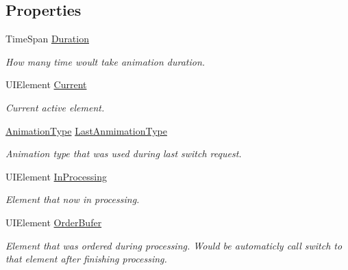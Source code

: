 \subsection*{Properties}
\begin{DoxyCompactItemize}
\item 
Time\+Span \mbox{\hyperlink{class_wpf_handler_1_1_u_i_1_1_controls_1_1_switch_panel_a3640cb1447755f529ffe36bccad2dc34}{Duration}}
\begin{DoxyCompactList}\small\item\em How many time woult take animation duration. \end{DoxyCompactList}\item 
U\+I\+Element \mbox{\hyperlink{class_wpf_handler_1_1_u_i_1_1_controls_1_1_switch_panel_a5412b80c31880fe852a7b82c0a81fd7a}{Current}}
\begin{DoxyCompactList}\small\item\em Current active element. \end{DoxyCompactList}\item 
\mbox{\hyperlink{class_wpf_handler_1_1_u_i_1_1_controls_1_1_switch_panel_aad6e1d850ec0101cc8d98c259971e272}{Animation\+Type}} \mbox{\hyperlink{class_wpf_handler_1_1_u_i_1_1_controls_1_1_switch_panel_aeef75c353f5212b3745cfa7b099e5406}{Last\+Anmimation\+Type}}
\begin{DoxyCompactList}\small\item\em Animation type that was used during last switch request. \end{DoxyCompactList}\item 
U\+I\+Element \mbox{\hyperlink{class_wpf_handler_1_1_u_i_1_1_controls_1_1_switch_panel_a885bc2ba8a565945b07a7e8b0116dcc6}{In\+Processing}}
\begin{DoxyCompactList}\small\item\em Element that now in processing. \end{DoxyCompactList}\item 
U\+I\+Element \mbox{\hyperlink{class_wpf_handler_1_1_u_i_1_1_controls_1_1_switch_panel_a91e83b22fc1d655359370611e2d76ec9}{Order\+Bufer}}
\begin{DoxyCompactList}\small\item\em Element that was ordered during processing. Would be automaticly call switch to that element after finishing processing. \end{DoxyCompactList}\end{DoxyCompactItemize}

